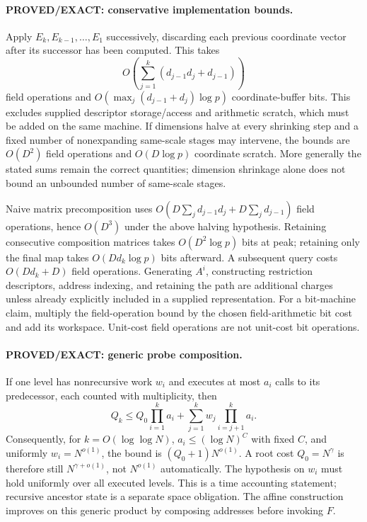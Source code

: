 \documentclass[11pt]{article}
\begin{document}
\paragraph{PROVED/EXACT: conservative implementation bounds.}
Apply $E_k,E_{k-1},\ldots,E_1$ successively, discarding each previous
coordinate vector after its successor has been computed. This takes
\[
 O\!\left(\sum_{j=1}^k(d_{j-1}d_j+d_{j-1})\right)
\]
field operations and $O(\max_j(d_{j-1}+d_j)\log p)$ coordinate-buffer bits.
This excludes supplied descriptor storage/access and arithmetic scratch,
which must be added on the same machine. If dimensions halve at every
shrinking step and a fixed number of nonexpanding same-scale stages may
intervene, the bounds are $O(D^2)$ field operations and $O(D\log p)$
coordinate scratch. More generally the stated sums remain the correct
quantities; dimension shrinkage alone does not bound an unbounded number
of same-scale stages.

Naive matrix precomposition uses
$O(D\sum_j d_{j-1}d_j+D\sum_jd_{j-1})$ field operations, hence $O(D^3)$
under the above halving hypothesis. Retaining consecutive composition
matrices takes $O(D^2\log p)$ bits at peak; retaining only the final map
takes $O(Dd_k\log p)$ bits afterward. A subsequent query costs
$O(Dd_k+D)$ field operations. Generating $A^i$, constructing restriction
descriptors, address indexing, and retaining the path are additional
charges unless already explicitly included in a supplied representation.
For a bit-machine claim, multiply the field-operation bound by the chosen
field-arithmetic bit cost and add its workspace. Unit-cost field operations
are not unit-cost bit operations.

\paragraph{PROVED/EXACT: generic probe composition.}
If one level has nonrecursive work $w_i$ and executes at most $a_i$ calls to
its predecessor, each counted with multiplicity, then
\[
 Q_k\le Q_0\prod_{i=1}^k a_i+
 \sum_{j=1}^k w_j\prod_{i=j+1}^k a_i.
\]
Consequently, for $k=O(\log\log N)$, $a_i\le(\log N)^C$ with fixed
$C$, and uniformly $w_i=N^{o(1)}$, the bound is
$(Q_0+1)N^{o(1)}$. A root cost $Q_0=N^\gamma$ is therefore still
$N^{\gamma+o(1)}$, not $N^{o(1)}$ automatically. The hypothesis on $w_i$
must hold uniformly over all executed levels. This is a time accounting
statement; recursive ancestor state is a separate space obligation.
The affine construction improves on this generic product by composing
addresses before invoking $F$.
\end{document}
